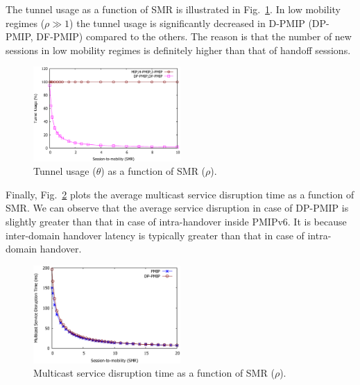 The tunnel usage as a function of SMR is illustrated in Fig.~\ref{fig:tunnel_usage}. In low mobility regimes ($\rho\gg1$) the tunnel usage is significantly decreased in D-PMIP (DP-PMIP, DF-PMIP) compared to the others. The reason is that the number of new sessions in low mobility regimes is definitely higher than that of handoff sessions.
\begin{figure}[h!]
\centering
\includegraphics[width=0.50\textwidth]{./Part3/Chapter7/figures/c9_tunnel_usage.eps}
\caption[Tunnel usage.]{Tunnel usage ($\theta$) as a function of SMR ($\rho$).}
\label{fig:tunnel_usage}
\end{figure}

Finally, Fig.~\ref{fig:multicast} plots the average multicast service disruption time as a function of SMR. We can observe that the average service disruption in case of DP-PMIP is slightly greater than that in case of intra-handover inside PMIPv6. It is because inter-domain handover latency is typically greater than that in case of intra-domain handover. 

\begin{figure}[h!]
\centering
\includegraphics[width=0.50\textwidth]{./Part3/Chapter7/figures/c9_multicast.eps}
\caption[Multicast service disruption time as a function of the session-to-mobility.]{Multicast service disruption time as a function of SMR ($\rho$).}
\label{fig:multicast}
\end{figure}

